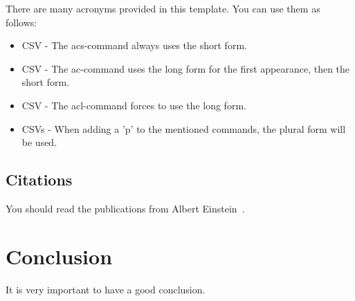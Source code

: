 There are many acronyms provided in this template. You can use them as follows:
\begin{itemize}
	\item \acs{CSV} - The acs-command always uses the short form.
	\item \ac{CSV} - The ac-command uses the long form for the first appearance, then the short form.
	\item \acl{CSV} - The acl-command forces to use the long form.
	\item \acp{CSV} - When adding a 'p' to the mentioned commands, the plural form will be used.
\end{itemize}

\subsection{Citations}
You should read the publications from Albert Einstein~\cite{einstein1920relativity}.

\section{Conclusion}
\label{sec:Conclusion}

It is very important to have a good conclusion.